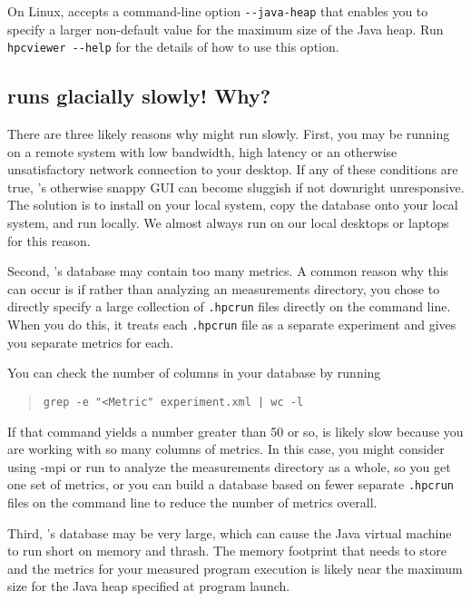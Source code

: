 \documentclass[11pt,twoside,letterpaper]{report}
\begin{document}
On Linux, \hpcviewer{} accepts a command-line option \verb|--java-heap| that enables you to specify a larger non-default value for the maximum size of the Java heap. Run \verb|hpcviewer --help| for the details of how to use this option.



\subsection{\hpcviewer{} runs glacially slowly! Why?}

There are three likely reasons why \hpcviewer{} might run slowly.
First, you may be running \hpcviewer{} on a remote system with low bandwidth, high latency or an otherwise unsatisfactory network connection to your desktop.
If any of these conditions are true, \hpcviewer{}'s otherwise snappy GUI can become sluggish if not downright unresponsive.
The solution is to install \hpcviewer{} on your local system, copy the database onto your local system, and run \hpcviewer{} locally.
We almost always run \hpcviewer{} on our local desktops or laptops for this reason.

Second, \HPCToolkit{}'s database may contain too many metrics.
A common reason why this can occur is if rather than analyzing an \HPCToolkit{}  measurements directory, you chose to directly specify a large collection of {\tt .hpcrun} files directly on the command line. When you do this, it treats each {\tt .hpcrun} file as a separate experiment and gives you separate metrics for each.

You can check the number of columns in your database by running
\begin{quote}
  \verb,grep -e "<Metric" experiment.xml | wc -l,
\end{quote}
If that command yields a number greater than 50 or so, \hpcviewer{} is likely slow because you are working with so many columns of metrics. In this case, you might consider using  \hpcprof-mpi{} or run \hpcprof{} to analyze the measurements directory as a whole, so you get one set of metrics, or you can build a database based on fewer separate {\tt .hpcrun} files on the command line to reduce the number of metrics overall.

Third, \HPCToolkit{}'s database may be very large, which can cause the Java virtual machine to run short on memory and thrash. The memory footprint that \hpcviewer{} needs to store and the metrics for your measured program execution is likely near the maximum size for the Java heap specified at program launch.
\end{document}

